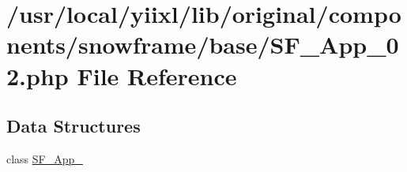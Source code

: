 \hypertarget{SF__App__02_8php}{
\section{/usr/local/yiixl/lib/original/components/snowframe/base/SF\_\-App\_\-02.php File Reference}
\label{SF__App__02_8php}
}
\subsection*{Data Structures}
\begin{DoxyCompactItemize}
\item 
class \hyperlink{classSF__App__02}{SF\_\-App\_}
\end{DoxyCompactItemize}
